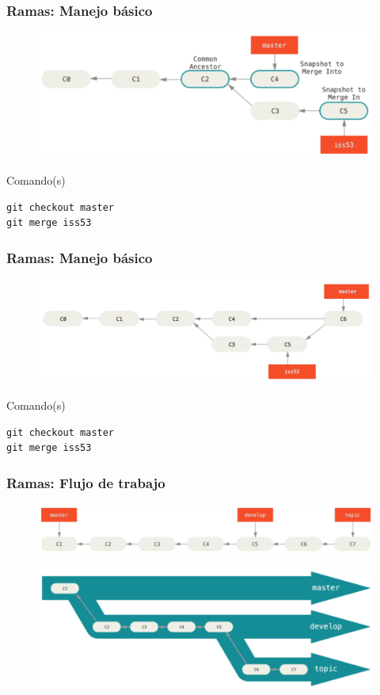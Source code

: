 \documentclass{beamer}
\begin{document}
\begin{frame}[fragile]
\frametitle{Ramas: Manejo básico}
\begin{figure}
\includegraphics[width=0.85\linewidth]{img/branching-7.png}
\end{figure}
\vskip 0.30cm
\footnotesize
\begin{block}{Comando(s)}
\begin{verbatim}
git checkout master
git merge iss53
\end{verbatim}
\end{block}
\end{frame}

\begin{frame}[fragile]
\frametitle{Ramas: Manejo básico}
\begin{figure}
\includegraphics[width=0.85\linewidth]{img/branching-8.png}
\end{figure}
\vskip 0.30cm
\footnotesize
\begin{block}{Comando(s)}
\begin{verbatim}
git checkout master
git merge iss53
\end{verbatim}
\end{block}
\end{frame}

\begin{frame}
\frametitle{Ramas: Flujo de trabajo}
\begin{figure}
\includegraphics[width=0.90\linewidth]{img/branching-9.png}
\end{figure}
\begin{figure}
\includegraphics[width=0.90\linewidth]{img/branching-10.png}
\end{figure}
\end{frame}
\end{document}
